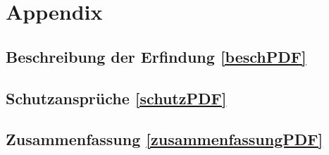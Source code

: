 \appendix
\chapter{Appendix}
\section*{Beschreibung der Erfindung \ref{beschPDF}}
\section*{Schutzansprüche \ref{schutzPDF}}
\section*{Zusammenfassung \ref{zusammenfassungPDF}}
\pagestyle{plain}
\centering
{}
\label{beschPDF} 

{}
\label{schutzPDF} 


{}
\label{zusammenfassungPDF}  


